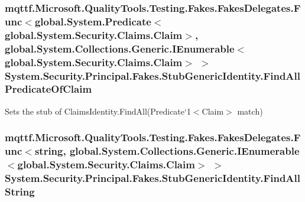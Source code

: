 \hypertarget{class_system_1_1_security_1_1_principal_1_1_fakes_1_1_stub_generic_identity_af4e05bd9f970ace41139219af2bcf64c}{
\subsubsection[{Find\-All\-Predicate\-Of\-Claim}]{\setlength{\rightskip}{0pt plus 5cm}mqttf.\-Microsoft.\-Quality\-Tools.\-Testing.\-Fakes.\-Fakes\-Delegates.\-Func$<$global.\-System.\-Predicate$<$global.\-System.\-Security.\-Claims.\-Claim$>$, global.\-System.\-Collections.\-Generic.\-I\-Enumerable$<$global.\-System.\-Security.\-Claims.\-Claim$>$ $>$ System.\-Security.\-Principal.\-Fakes.\-Stub\-Generic\-Identity.\-Find\-All\-Predicate\-Of\-Claim}}\label{class_system_1_1_security_1_1_principal_1_1_fakes_1_1_stub_generic_identity_af4e05bd9f970ace41139219af2bcf64c}


Sets the stub of Claims\-Identity.\-Find\-All(Predicate`1$<$Claim$>$ match)

\hypertarget{class_system_1_1_security_1_1_principal_1_1_fakes_1_1_stub_generic_identity_a0e563316b344d60bbd6ae75b767b1fc0}{
\subsubsection[{Find\-All\-String}]{\setlength{\rightskip}{0pt plus 5cm}mqttf.\-Microsoft.\-Quality\-Tools.\-Testing.\-Fakes.\-Fakes\-Delegates.\-Func$<$string, global.\-System.\-Collections.\-Generic.\-I\-Enumerable$<$global.\-System.\-Security.\-Claims.\-Claim$>$ $>$ System.\-Security.\-Principal.\-Fakes.\-Stub\-Generic\-Identity.\-Find\-All\-String}}\label{class_system_1_1_security_1_1_principal_1_1_fakes_1_1_stub_generic_identity_a0e563316b344d60bbd6ae75b767b1fc0}


